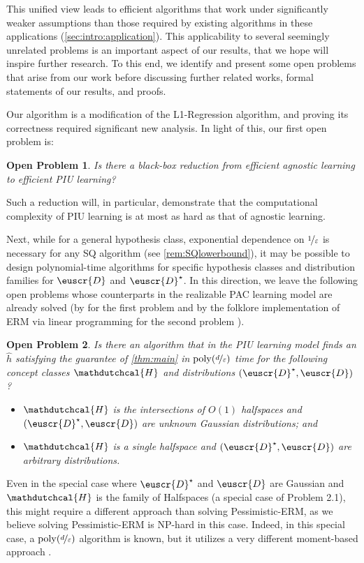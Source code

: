 \documentclass[11pt]{article}
\theoremstyle{plain}
\newtheorem{openproblem}{Open Problem}
\theoremstyle{definition}
\theoremstyle{remark}
\newcommand{\sinparen}[1]{(#1)}
\newcommand{\nfrac}[2]{\nicefrac{#1}{#2}}
\newcommand{\poly}{\mathrm{poly}}
\newcommand{\eps}{\varepsilon}
\newcommand{\wh}[1]{\widehat{#1}}
\newcommand{\customcal}[1]{\euscr{#1}}
\newcommand{\cD}{\customcal{D}}
\newcommand{\hypo}[1]{\mathdutchcal{#1}}
\newcommand{\hyH}{\hypo{H}}
\newcommand{\pERM}{Pessimistic-ERM}
\newcommand{\lreg}{\textsf{L1-Regression}}
\newcommand{\cDtrue}{\cD^\star}
\newcommand{\cDgiven}{\cD}
\newcommand{\np}{\textsf{NP}}
\begin{document}
        This unified view leads to efficient algorithms that work under significantly weaker assumptions than those required by existing algorithms in these applications (\cref{sec:intro:application}). 
        This applicability to several seemingly unrelated problems is an important aspect of our results, that we hope will inspire further research.
        To this end, we identify and present some open problems that arise from our work before discussing further related works, formal statements of our results, and proofs. 
        
        Our algorithm is a modification of the \lreg{} algorithm, and proving its correctness required significant new analysis.
        In light of this, our first open problem is:
        \begin{openproblem}
            \textit{Is there a black-box reduction from efficient agnostic learning to efficient PIU learning?}
        \end{openproblem}
        Such a reduction will, in particular, demonstrate that the computational complexity of PIU learning is at most as hard as that of agnostic learning.
         
        
        Next, while for a general hypothesis class, exponential dependence on $\nfrac{1}{\eps}$ is necessary for any SQ algorithm (see \cref{rem:SQlowerbound}), it may be possible to design polynomial-time algorithms for specific hypothesis classes and distribution families for $\cD$ and $\cDtrue$. 
        In this direction, we leave the following open problems whose counterparts in the realizable PAC learning model are already solved (by \citet{vempala2010convexGaussian}  for the first problem and by the folklore implementation of ERM via linear programming for the second problem \cite{mohri2018foundations}).
        \begin{openproblem}         
             Is there an algorithm that in the PIU learning model finds an $\wh{h}$ satisfying the guarantee of \cref{thm:main} in $\poly(\nfrac{d}{\eps})$  time for the following concept classes $\hyH$ and distributions $(\cDtrue,\cD)$?
            \begin{itemize}[itemsep=0pt]
                \item[$\triangleright$] $\hyH$ is the intersections of $O(1)$ halfspaces and $\sinparen{\cDtrue,\cD}$ are unknown Gaussian distributions; and 
                \item[$\triangleright$] $\hyH$ is a single halfspace and $\sinparen{\cDtrue,\cD}$ are arbitrary distributions.
            \end{itemize}
        \end{openproblem} 
        Even in the special case where $\cDtrue$ and $\cDgiven$ are Gaussian and $\hyH$ is the family of Halfspaces (a special case of Problem 2.1), this might require a different approach than solving \pERM{}, as we believe solving \pERM{} is \np{}-hard in this case.
        Indeed, in this special case, a $\poly(\nfrac{d}{\eps})$ algorithm is known, but it utilizes a very different moment-based approach \cite{lee2024unknown}. %
        
\end{document}
